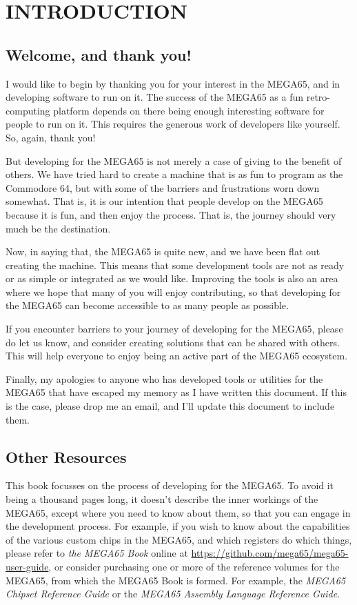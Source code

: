 \part{INTRODUCTION}

\chapter{Welcome, and thank you!}

I would like to begin by thanking you for your interest in the MEGA65,
and in developing software to run on it. The success of the MEGA65 as
a fun retro-computing platform depends on there being enough
interesting software for people to run on it.  This requires the
generous work of developers like yourself. So, again, thank you!

But developing for the MEGA65 is not merely a case of giving to the
benefit of others. We have tried hard to create a machine that is as
fun to program as the Commodore 64, but with some of the barriers
and frustrations worn down somewhat.  That is, it is our intention
that people develop on the MEGA65 because it is fun, and then enjoy
the process.  That is, the journey should very much be the
destination.

Now, in saying that, the MEGA65 is quite new, and we have been flat
out creating the machine. This means that some development tools are
not as ready or as simple or integrated as we would like.  Improving
the tools is also an area where we hope that many of you will enjoy
contributing, so that developing for the MEGA65 can become accessible
to as many people as possible.

If you encounter barriers to your
journey of developing for the MEGA65, please do let us know, and
consider creating solutions that can be shared with others.  This will
help everyone to enjoy being an active part of the MEGA65 ecosystem.

Finally, my apologies to anyone who has developed tools or utilities
for the MEGA65 that have escaped my memory as I have written this
document.  If this is the case, please drop me an email, and I'll
update this document to include them.

\chapter{Other Resources}

This book focusses on the process of developing for the MEGA65.  To
avoid it being a thousand pages long, it doesn't describe the inner
workings of the MEGA65, except where you need to know about them, so
that you can engage in the development process.  For example, if you
wish to know about the capabilities of the various custom chips in the
MEGA65, and which registers do which things, please refer to {\em the
MEGA65 Book} online
at \url{https://github.com/mega65/mega65-user-guide}, or consider
purchasing one or more of the reference volumes for the MEGA65, from
which the MEGA65 Book is formed.  For example, the {\em MEGA65 Chipset
Reference Guide} or the {\em MEGA65 Assembly Language Reference Guide}.


